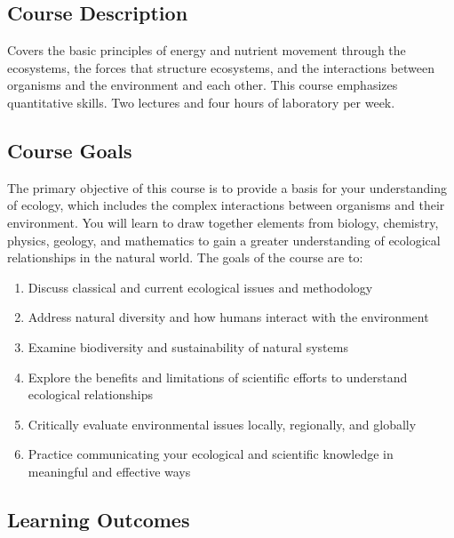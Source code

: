 \documentclass{tufte-handout}
\begin{document}
\begin{fullwidth}

\section{Course Description}

Covers the basic principles of energy and nutrient movement through the ecosystems, the forces that structure ecosystems, and the interactions between organisms and the environment and each other. This course emphasizes quantitative skills. Two lectures and four hours of laboratory per week.

\subsection{Course Goals}

The primary objective of this course is to provide a basis for your understanding of ecology, which includes the complex interactions between organisms and their environment. You will learn to draw together elements from biology, chemistry, physics, geology, and mathematics to gain a greater understanding of ecological relationships in the natural world. The goals of the course are to:

\begin{enumerate}
	\item Discuss classical and current ecological issues and methodology
	\item Address natural diversity and how humans interact with the environment
	\item Examine biodiversity and sustainability of natural systems
	\item Explore the benefits and limitations of scientific efforts to understand ecological relationships
	\item Critically evaluate environmental issues locally, regionally, and globally
	\item Practice communicating your ecological and scientific knowledge in meaningful and effective ways
\end{enumerate}

\subsection{Learning Outcomes}


\end{fullwidth}
\end{document}
